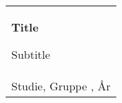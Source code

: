 %
\begin{titlepage}
\vspace*{\fill}
  \addtolength{\hoffset}{0.5\evensidemargin-0.5\oddsidemargin} %
  \noindent%
  {\color{white}\colorbox{aaublue}{\begin{tabular}{@{}p{\textwidth}@{}}
    \begin{center}
    \Huge{\textbf{
      Title%
    }}
    \end{center}
    \begin{center}
      \Large{
        Subtitle %
      }
    \end{center}
    \vspace{0.2cm}
   \begin{center}
    {\Large
      First Last, 
      First Last, 
      First Last, 
      First Last, 
      First Last,
      First Last
    }\\
    \vspace{0.2cm}
    {\large
      Studie, Gruppe , År%
    }
   \end{center}
   \vspace{0.2cm}
   \begin{center}
    {\Large
      Tema
    }
   \end{center}
  \end{tabular}}}
  \vfill

\end{titlepage}
\clearpage
